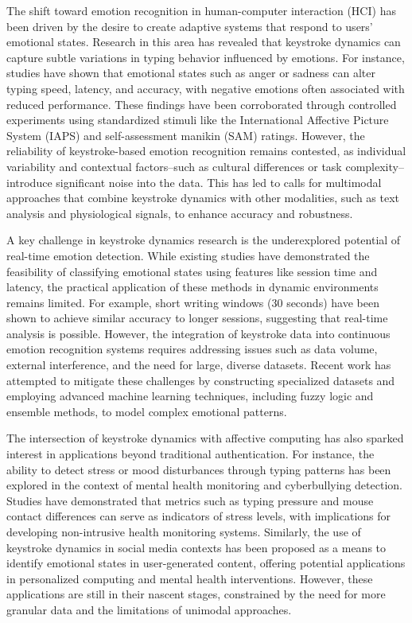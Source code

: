 \documentclass[conference]{IEEEtran}
\begin{document}
The shift toward emotion recognition in human-computer interaction (HCI) has been driven by the desire to create adaptive systems that respond to users' emotional states. Research in this area has revealed that keystroke dynamics can capture subtle variations in typing behavior influenced by emotions. For instance, studies have shown that emotional states such as anger or sadness can alter typing speed, latency, and accuracy, with negative emotions often associated with reduced performance. These findings have been corroborated through controlled experiments using standardized stimuli like the International Affective Picture System (IAPS) and self-assessment manikin (SAM) ratings. However, the reliability of keystroke-based emotion recognition remains contested, as individual variability and contextual factors--such as cultural differences or task complexity--introduce significant noise into the data. This has led to calls for multimodal approaches that combine keystroke dynamics with other modalities, such as text analysis and physiological signals, to enhance accuracy and robustness.  

A key challenge in keystroke dynamics research is the underexplored potential of real-time emotion detection. While existing studies have demonstrated the feasibility of classifying emotional states using features like session time and latency, the practical application of these methods in dynamic environments remains limited. For example, short writing windows (30 seconds) have been shown to achieve similar accuracy to longer sessions, suggesting that real-time analysis is possible. However, the integration of keystroke data into continuous emotion recognition systems requires addressing issues such as data volume, external interference, and the need for large, diverse datasets. Recent work has attempted to mitigate these challenges by constructing specialized datasets and employing advanced machine learning techniques, including fuzzy logic and ensemble methods, to model complex emotional patterns.  

The intersection of keystroke dynamics with affective computing has also sparked interest in applications beyond traditional authentication. For instance, the ability to detect stress or mood disturbances through typing patterns has been explored in the context of mental health monitoring and cyberbullying detection. Studies have demonstrated that metrics such as typing pressure and mouse contact differences can serve as indicators of stress levels, with implications for developing non-intrusive health monitoring systems. Similarly, the use of keystroke dynamics in social media contexts has been proposed as a means to identify emotional states in user-generated content, offering potential applications in personalized computing and mental health interventions. However, these applications are still in their nascent stages, constrained by the need for more granular data and the limitations of unimodal approaches.  
\end{document}
